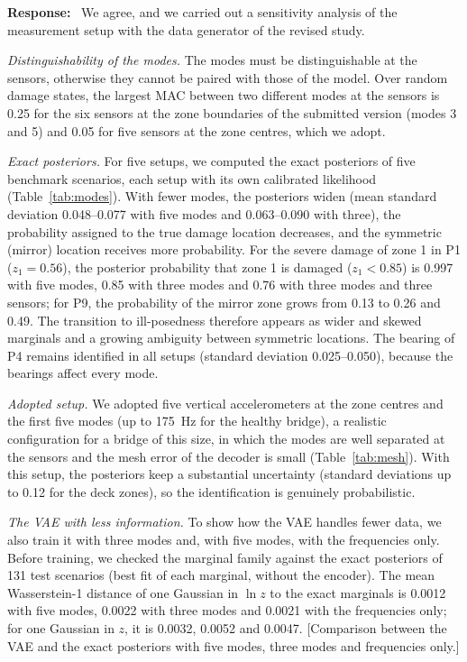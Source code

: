 \documentclass[11pt]{article}
\newenvironment{response}{\par\smallskip\noindent\color{resp}\textbf{Response:}\ }{\par}
\newcommand{\tbd}[1]{\textcolor{note}{\textsf{[#1]}}}
\begin{document}
\begin{response}
We agree, and we carried out a sensitivity analysis of the measurement setup with the data generator of the revised
study.

\textit{Distinguishability of the modes.} The modes must be distinguishable at the sensors, otherwise they cannot be
paired with those of the model. Over random damage states, the largest MAC between two different modes at the sensors is
0.25 for the six sensors at the zone boundaries of the submitted version (modes 3 and 5) and 0.05 for five sensors at the
zone centres, which we adopt.

\textit{Exact posteriors.} For five setups, we computed the exact posteriors of five benchmark scenarios, each setup with
its own calibrated likelihood (Table~\ref{tab:modes}). With fewer modes, the posteriors widen (mean standard deviation
0.048--0.077 with five modes and 0.063--0.090 with three), the probability assigned to the true damage location
decreases, and the symmetric (mirror) location receives more probability. For the severe damage of zone 1 in P1
($z_1=0.56$), the posterior probability that zone 1 is damaged ($z_1<0.85$) is 0.997 with five modes, 0.85 with three
modes and 0.76 with three modes and three sensors; for P9, the probability of the mirror zone grows from 0.13 to 0.26 and
0.49. The transition to ill-posedness therefore appears as wider and skewed marginals and a growing ambiguity between
symmetric locations. The bearing of P4 remains identified in all setups (standard deviation 0.025--0.050), because the
bearings affect every mode.

\textit{Adopted setup.} We adopted five vertical accelerometers at the zone centres and the first five modes (up to
175~Hz for the healthy bridge), a realistic configuration for a bridge of this size, in which the modes are well
separated at the sensors and the mesh error of the decoder is small (Table~\ref{tab:mesh}). With this setup, the
posteriors keep a substantial uncertainty (standard deviations up to 0.12 for the deck zones), so the identification is
genuinely probabilistic.

\textit{The VAE with less information.} To show how the VAE handles fewer data, we also train it with three modes and,
with five modes, with the frequencies only. Before training, we checked the marginal family against the exact posteriors
of 131 test scenarios (best fit of each marginal, without the encoder). The mean Wasserstein-1 distance of one Gaussian in
$\ln z$ to the exact marginals is 0.0012 with five modes, 0.0022 with three modes and 0.0021 with the frequencies only;
for one Gaussian in $z$, it is 0.0032, 0.0052 and 0.0047.
\tbd{Comparison between the VAE and the exact posteriors with five modes, three modes and frequencies only.}
\end{response}
\end{document}
